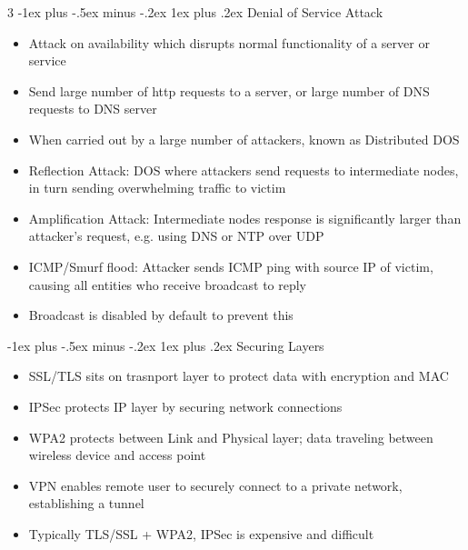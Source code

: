 \documentclass[10pt, landscape]{article}
\makeatletter
\renewcommand{\subsection}{\@startsection{subsection}{3}{0mm}%
                                {-1ex plus -.5ex minus -.2ex}%
                                {1ex plus .2ex}%
                                {\normalfont\small\bfseries}}%
\makeatother
\begin{document}
\begin{multicols*}{3}
\subsection{Denial of Service Attack}
\begin{itemize}
    \item Attack on availability which disrupts normal functionality of a server or service
    \item Send large number of http requests to a server, or large number of DNS requests to DNS server
    \item When carried out by a large number of attackers, known as Distributed DOS
    \item Reflection Attack: DOS where attackers send requests to intermediate nodes, in turn sending overwhelming traffic to victim
    \item Amplification Attack: Intermediate nodes response is significantly larger than attacker's request, e.g. using DNS or NTP over UDP
    \item ICMP/Smurf flood: Attacker sends ICMP ping with source IP of victim, causing all entities who receive broadcast to reply
    \item Broadcast is disabled by default to prevent this
\end{itemize}

\subsection{Securing Layers}
\begin{itemize}
    \item SSL/TLS sits on trasnport layer to protect data with encryption and MAC
    \item IPSec protects IP layer by securing network connections
    \item WPA2 protects between Link and Physical layer; data traveling between wireless device and access point
    \item VPN enables remote user to securely connect to a private network, establishing a tunnel
    \item Typically TLS/SSL + WPA2, IPSec is expensive and difficult
\end{itemize}


\end{multicols*}
\end{document}
